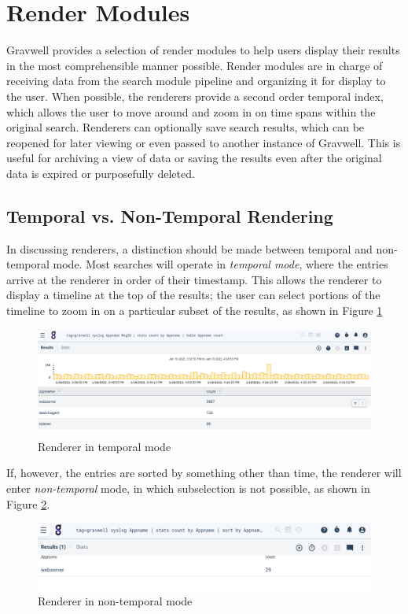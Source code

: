 \clearpage
\section{Render Modules}
Gravwell provides a selection of render modules to help users display
their results in the most comprehensible manner possible. Render modules
are in charge of receiving data from the search module pipeline and
organizing it for display to the user. When possible, the renderers
provide a second order temporal index, which allows the user to move
around and zoom in on time spans within the original search. Renderers
can optionally save search results, which can be reopened for later
viewing or even passed to another instance of Gravwell. This is useful
for archiving a view of data or saving the results even after the
original data is expired or purposefully deleted.

\subsection{Temporal vs. Non-Temporal Rendering}
\label{sec:temporal}
In discussing renderers, a distinction should be made between temporal
and non-temporal mode. Most searches will operate in \emph{temporal mode},
where the entries arrive at the renderer in order of their
timestamp. This allows the renderer to display a timeline at the top
of the results; the user can select portions of the timeline to zoom in
on a particular subset of the results, as shown in Figure \ref{fig:temporal-render}

\begin{figure}
	\includegraphics[width=0.8\linewidth]{images/temporal-render.png}
	\caption{Renderer in temporal mode}
	\label{fig:temporal-render}
\end{figure}

If, however, the entries are sorted by something other than time, the
renderer will enter \emph{non-temporal} mode, in which subselection is not
possible, as shown in Figure \ref{fig:nontemporal-render}.

\begin{figure}
	\includegraphics[width=0.8\linewidth]{images/nontemporal-render.png}
	\caption{Renderer in non-temporal mode}
	\label{fig:nontemporal-render}
\end{figure}

